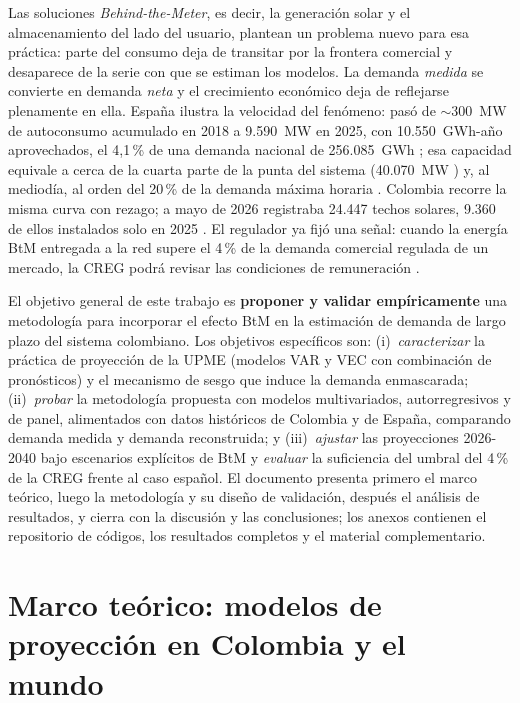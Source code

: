 \documentclass[11pt,letterpaper]{article}
\begin{document}
Las soluciones \emph{Behind-the-Meter}, es decir, la generación solar y el
almacenamiento del lado del usuario, plantean un problema nuevo para esa práctica: parte
del consumo deja de transitar por la frontera comercial y desaparece de la
serie con que se estiman los modelos. La demanda \emph{medida} se convierte
en demanda \emph{neta} y el crecimiento económico deja de reflejarse
plenamente en ella. España ilustra la velocidad del fenómeno: pasó de
${\sim}300$~MW de autoconsumo acumulado en 2018 a 9.590~MW en 2025, con
10.550~GWh-año aprovechados, el 4,1\,\% de una demanda nacional de
256.085~GWh \cite{appa2025}; esa capacidad equivale a cerca de la cuarta
parte de la punta del sistema (40.070~MW \cite{ree2026}) y, al mediodía, al
orden del 20\,\% de la demanda máxima horaria \cite{proyecto}. Colombia
recorre la misma curva con rezago; a mayo de 2026 registraba 24.447 techos
solares, 9.360 de ellos instalados solo en 2025 \cite{upmetechos}. El
regulador ya fijó una señal: cuando la energía BtM entregada a la red supere
el 4\,\% de la demanda comercial regulada de un mercado, la CREG podrá
revisar las condiciones de remuneración \cite{creg101072,creg901099}.

El objetivo general de este trabajo es \textbf{proponer y validar
empíricamente} una metodología para incorporar el efecto BtM en la estimación
de demanda de largo plazo del sistema colombiano. Los objetivos específicos
son: (i)~\emph{caracterizar} la práctica de proyección de la UPME (modelos
VAR y VEC con combinación de pronósticos) y el mecanismo de sesgo que induce
la demanda enmascarada; (ii)~\emph{probar} la metodología propuesta con
modelos multivariados, autorregresivos y de panel, alimentados con datos
históricos de Colombia y de España, comparando demanda medida y demanda
reconstruida; y (iii)~\emph{ajustar} las proyecciones 2026-2040 bajo
escenarios explícitos de BtM y \emph{evaluar} la suficiencia del umbral del
4\,\% de la CREG frente al caso español. El documento presenta primero el
marco teórico, luego la metodología y su diseño de validación, después el
análisis de resultados, y cierra con la discusión y las conclusiones; los
anexos contienen el repositorio de códigos, los resultados completos y el
material complementario.

\section{Marco teórico: modelos de proyección en Colombia y el mundo}
\end{document}
